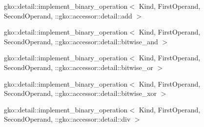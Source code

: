 \begin{DoxyCompactList}
\item {}
\item {}
\item gko\+:\+:detail\+:\+:implement\+\_\+binary\+\_\+operation$<$ Kind, First\+Operand, Second\+Operand, \+:\+:gko\+:\+:accessor\+:\+:detail\+:\+:add $>$\begin{DoxyCompactList}
\item {}
\end{DoxyCompactList}
\item gko\+:\+:detail\+:\+:implement\+\_\+binary\+\_\+operation$<$ Kind, First\+Operand, Second\+Operand, \+:\+:gko\+:\+:accessor\+:\+:detail\+:\+:bitwise\+\_\+and $>$\begin{DoxyCompactList}
\item {}
\end{DoxyCompactList}
\item gko\+:\+:detail\+:\+:implement\+\_\+binary\+\_\+operation$<$ Kind, First\+Operand, Second\+Operand, \+:\+:gko\+:\+:accessor\+:\+:detail\+:\+:bitwise\+\_\+or $>$\begin{DoxyCompactList}
\item {}
\end{DoxyCompactList}
\item gko\+:\+:detail\+:\+:implement\+\_\+binary\+\_\+operation$<$ Kind, First\+Operand, Second\+Operand, \+:\+:gko\+:\+:accessor\+:\+:detail\+:\+:bitwise\+\_\+xor $>$\begin{DoxyCompactList}
\item {}
\end{DoxyCompactList}
\item gko\+:\+:detail\+:\+:implement\+\_\+binary\+\_\+operation$<$ Kind, First\+Operand, Second\+Operand, \+:\+:gko\+:\+:accessor\+:\+:detail\+:\+:div $>$\begin{DoxyCompactList}

\end{DoxyCompactList}
\end{DoxyCompactList}

